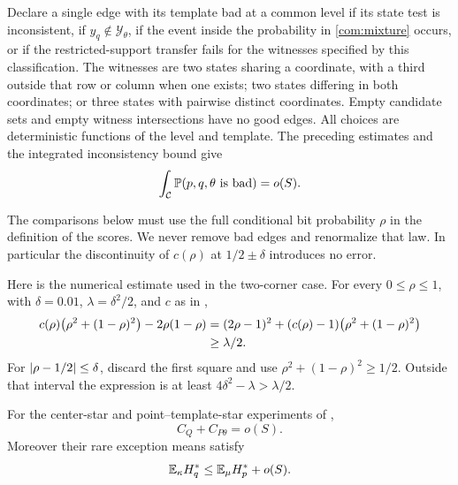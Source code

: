 Declare a single edge with its template bad at a common level if its state
test is inconsistent, if \(y_q\notin\mathcal Y_\theta\), if
the event inside the probability in \eqref{com:mixture} occurs, or if the
restricted-support transfer fails for
the witnesses specified by this classification. The witnesses are two
states sharing a coordinate, with a third outside that row or column when
one exists; two states differing in both coordinates; or three states with
pairwise distinct coordinates. Empty candidate sets and empty witness
intersections have no good edges. All choices are deterministic functions
of the level and template. The preceding estimates and the integrated
inconsistency bound give
\begin{equation}\label{com:bad-mass}
 \int_{\mathcal C}\mathbb P(p,q,\theta\text{ is bad})=o(S).
\end{equation}

The comparisons below must use the full conditional bit probability
\(\rho\) in the definition of the scores. We never remove bad edges and
renormalize that law. In particular the discontinuity of \(c(\rho)\) at
\(1/2\pm\delta\) introduces no error.

Here is the numerical estimate used in the two-corner case. For every
\(0\le\rho\le1\), with \(\delta=0.01\), \(\lambda=\delta^2/2\), and
\(c\) as in ,
\begin{align}
 c(\rho)\bigl(\rho^2+(1-\rho)^2\bigr)-2\rho(1-\rho)
 &= (2\rho-1)^2+
       (c(\rho)-1)\bigl(\rho^2+(1-\rho)^2\bigr)\notag\\
 &\ge\lambda/2.\label{com:score-polynomial}
\end{align}
For \(\lvert \rho-1/2\rvert\le\delta\), discard the first square and use
\(\rho^2+(1-\rho)^2\ge1/2\). Outside that interval the expression is at
least \(4\delta^2-\lambda>\lambda/2\).

\begin{proposition}\label{com:variation}
For the center-star and point--template-star experiments of
,
\begin{equation}\label{com:variation-eq}
 C_Q+C_{P\theta}=o(S).
\end{equation}
Moreover their rare exception means satisfy
\begin{equation}\label{com:center-rare}
 \mathbb E_\kappa H_q^*\le\mathbb E_\mu H_p^*+o(S).
\end{equation}
\end{proposition}

